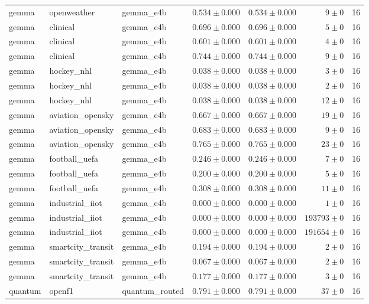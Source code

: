 \begin{table}[htbp]
\begin{tabular}{l l l r r r r}
gemma & openweather & gemma\_e4b & $0.534\pm0.000$ & $0.534\pm0.000$ & $9\pm0$ & 16 \\
gemma & clinical & gemma\_e4b & $0.696\pm0.000$ & $0.696\pm0.000$ & $5\pm0$ & 16 \\
gemma & clinical & gemma\_e4b & $0.601\pm0.000$ & $0.601\pm0.000$ & $4\pm0$ & 16 \\
gemma & clinical & gemma\_e4b & $0.744\pm0.000$ & $0.744\pm0.000$ & $9\pm0$ & 16 \\
gemma & hockey\_nhl & gemma\_e4b & $0.038\pm0.000$ & $0.038\pm0.000$ & $3\pm0$ & 16 \\
gemma & hockey\_nhl & gemma\_e4b & $0.038\pm0.000$ & $0.038\pm0.000$ & $2\pm0$ & 16 \\
gemma & hockey\_nhl & gemma\_e4b & $0.038\pm0.000$ & $0.038\pm0.000$ & $12\pm0$ & 16 \\
gemma & aviation\_opensky & gemma\_e4b & $0.667\pm0.000$ & $0.667\pm0.000$ & $19\pm0$ & 16 \\
gemma & aviation\_opensky & gemma\_e4b & $0.683\pm0.000$ & $0.683\pm0.000$ & $9\pm0$ & 16 \\
gemma & aviation\_opensky & gemma\_e4b & $0.765\pm0.000$ & $0.765\pm0.000$ & $23\pm0$ & 16 \\
gemma & football\_uefa & gemma\_e4b & $0.246\pm0.000$ & $0.246\pm0.000$ & $7\pm0$ & 16 \\
gemma & football\_uefa & gemma\_e4b & $0.200\pm0.000$ & $0.200\pm0.000$ & $5\pm0$ & 16 \\
gemma & football\_uefa & gemma\_e4b & $0.308\pm0.000$ & $0.308\pm0.000$ & $11\pm0$ & 16 \\
gemma & industrial\_iiot & gemma\_e4b & $0.000\pm0.000$ & $0.000\pm0.000$ & $1\pm0$ & 16 \\
gemma & industrial\_iiot & gemma\_e4b & $0.000\pm0.000$ & $0.000\pm0.000$ & $193793\pm0$ & 16 \\
gemma & industrial\_iiot & gemma\_e4b & $0.000\pm0.000$ & $0.000\pm0.000$ & $191654\pm0$ & 16 \\
gemma & smartcity\_transit & gemma\_e4b & $0.194\pm0.000$ & $0.194\pm0.000$ & $2\pm0$ & 16 \\
gemma & smartcity\_transit & gemma\_e4b & $0.067\pm0.000$ & $0.067\pm0.000$ & $2\pm0$ & 16 \\
gemma & smartcity\_transit & gemma\_e4b & $0.177\pm0.000$ & $0.177\pm0.000$ & $3\pm0$ & 16 \\
quantum & openf1 & quantum\_routed & $0.791\pm0.000$ & $0.791\pm0.000$ & $37\pm0$ & 16 \\

\end{tabular}
\end{table}

